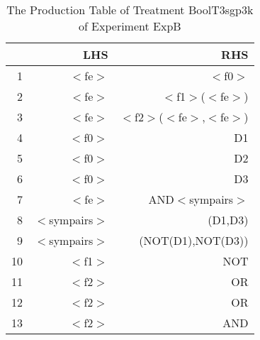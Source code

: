 \begin{table}[ht]
\centering
\begin{tabular}{rrr}
  \hline
 & LHS & RHS \\ 
  \hline
1 & $<$fe$>$ & $<$f0$>$ \\ 
  2 & $<$fe$>$ & $<$f1$>$($<$fe$>$) \\ 
  3 & $<$fe$>$ & $<$f2$>$($<$fe$>$,$<$fe$>$) \\ 
  4 & $<$f0$>$ & D1 \\ 
  5 & $<$f0$>$ & D2 \\ 
  6 & $<$f0$>$ & D3 \\ 
  7 & $<$fe$>$ & AND$<$sympairs$>$ \\ 
  8 & $<$sympairs$>$ & (D1,D3) \\ 
  9 & $<$sympairs$>$ & (NOT(D1),NOT(D3)) \\ 
  10 & $<$f1$>$ & NOT \\ 
  11 & $<$f2$>$ & OR \\ 
  12 & $<$f2$>$ & OR \\ 
  13 & $<$f2$>$ & AND \\ 
   \hline
\end{tabular}
\caption{The Production Table of Treatment BoolT3sgp3k of Experiment ExpB} 
\end{table}
